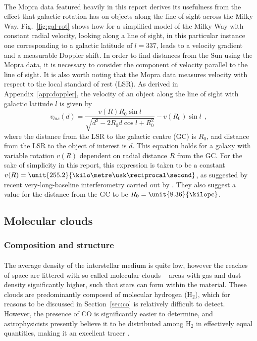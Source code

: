 \documentclass[a4paper, titlepage, oneside]{article}
\newcommand{\molec}[2]{\ensuremath{\text{#1}_{#2}}}
\newcommand{\parsec}{\mathrm{pc}}
\begin{document}
\begin{multicols}{2}
\paragraph{}
The Mopra data featured heavily in this report \parencite{Burton:2013} derives its usefulness from the effect that galactic rotation has on objects along the line of sight across the Milky Way. Fig.~\ref{fig:gal-rot} shows how for a simplified model of the Milky Way with constant radial velocity, looking along a line of sight, in this particular instance one corresponding to a galactic latitude of \(l=337\), leads to a velocity gradient and a measurable Doppler shift. In order to find distances from the Sun using the Mopra data, it is necessary to consider the component of velocity parallel to the line of sight. It is also worth noting that the Mopra data measures velocity with respect to the local standard of rest (LSR). As derived in Appendix~\ref{app:doppler}, the velocity of an object along the line of sight with galactic latitude \(l\) is given by
\begin{equation}
  v_{los}(d)=\frac{v(R)R_0\sin{l}}{\sqrt{d^2-2R_0d\cos{l}+R_0^2}}-v(R_0)\sin{l}\;\,,
\end{equation}
where the distance from the LSR to the galactic centre (GC) is \(R_0\), and distance from the LSR to the object of interest is \(d\). This equation holds for a galaxy with variable rotation \(v(R)\) dependent on radial distance \(R\) from the GC. For the sake of simplicity in this report, this expression is taken to be a constant \(v(R)=\unit{255.2}{\kilo\metre\usk\reciprocal\second}\), as suggested by recent very-long-baseline interferometry carried out by \textcite{Reid:2014}. They also suggest a value for the distance from the GC to be \(R_0=\unit{8.36}{\kilo\parsec}\).

\subsection{Molecular clouds}
\subsubsection{Composition and structure}
\paragraph{}
The average density of the interstellar medium is quite low, however the reaches of space are littered with so-called molecular clouds -- areas with gas and dust density significantly higher, such that stars can form within the material. These clouds are predominantly composed of molecular hydrogen (\molec{H}{2}), which for reasons to be discussed in Section~\ref{sec:co} is relatively difficult to detect. However, the presence of CO is significantly easier to determine, and astrophysicists presently believe it to be distributed among \molec{H}{2} in effectively equal quantities, making it an excellent tracer \parencite{Glover:2011}.


\end{multicols}
\end{document}
